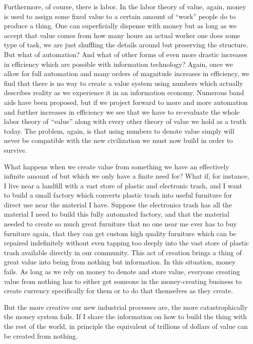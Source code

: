Furthermore, of course, there is labor.  In the labor theory of value, again, money is used to assign some fixed value to a certain amount of ``work'' people do to produce a thing. One can superficially dispense with money but as long as we accept that value comes from how many hours an actual worker one does some type of task, we are just shuffling the details around but preserving the structure.  But what of automation?  And what of other forms of even more drastic increases in efficiency which are possible with information technology? Again, once we allow for full automation and many orders of magnitude increases in efficiency, we find that there is no way to create a value system using numbers which actually describes reality as we experience it in an information economy.  Numerous band aids have been proposed, but if we project forward to more and more automation and further increases in efficiency we see that we have to re-evaluate the whole labor theory of ``value'' along with every other theory of value we hold as a truth today.  The problem, again, is that using numbers to denote value simply will never be compatible with the new civilization we must now build in order to survive.

What happens when we create value from something we have an effectively infinite amount of but which we only have a finite need for?  What if, for instance, I live near a landfill with a vast store of plastic and electronic trash, and I want to build a small factory which converts plastic trash into useful furniture for direct use near the material I have.  Suppose the electronics trash has all the material I need to build this fully automated factory, and that the material needed to create so much great furniture that no one near me ever has to buy furniture again, that they can get custom high quality furniture which can be repaired indefinitely without even tapping too deeply into the vast store of plastic trash available directly in our community.  This act of creation brings a thing of great value into being from nothing but information.  In this situation, money fails.  As long as we rely on money to denote and store value, everyone creating value from nothing has to either get someone in the money-creating business to create currency specifically for them or to do that themselves as they create.  

But the more creative our new industrial processes are, the more catastrophically the money system fails.  If I share the information on how to build the thing with the rest of the world, in principle the equivalent of trillions of dollars of value can be created from nothing. 

